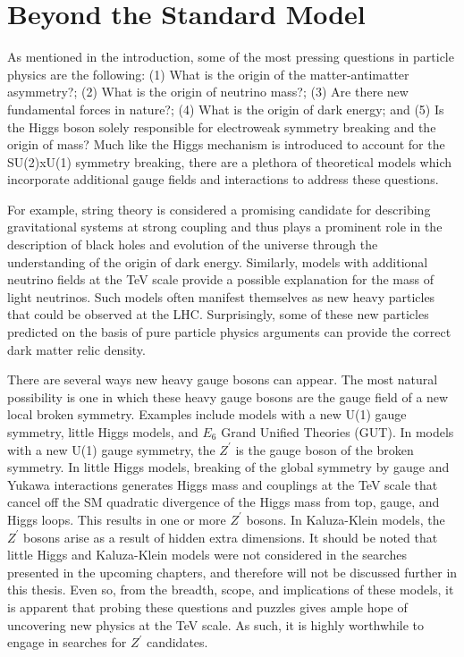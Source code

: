 \section{Beyond the Standard Model}


As mentioned in the introduction, some of the most pressing questions in particle physics are the following: (1) What is the origin of the matter-antimatter asymmetry?; (2) What is the origin of neutrino mass?; (3) Are there new fundamental forces in nature?; (4) What is the origin of dark energy; and (5) Is the Higgs boson solely responsible for electroweak symmetry breaking and the origin of mass? Much like the Higgs mechanism is introduced to account for the SU(2)xU(1) 
symmetry breaking, there are a plethora of theoretical models which incorporate additional gauge fields and interactions to address these questions. 

For example, string theory is considered a promising candidate for describing gravitational systems at strong coupling and thus plays a prominent role in the description of black holes and evolution of the universe through the understanding of the origin of dark energy. Similarly, models with additional neutrino fields at the TeV scale provide a possible explanation for the mass of light neutrinos. Such models often manifest themselves as new heavy particles that could be observed at the LHC. Surprisingly, some of these new particles predicted on the basis of pure particle physics arguments can provide the correct dark matter relic density. 

There are several ways new heavy gauge bosons can appear. The most natural possibility is one in which these heavy gauge bosons are the gauge field of a new local broken symmetry. Examples include models with a new U(1) gauge symmetry\cite{SSM}, little Higgs models\cite{LittleHiggs}, and $E_6$ Grand Unified Theories (GUT)\cite{E6}. In models with a new U(1) gauge symmetry, the $Z^\prime$ is the gauge boson of the broken symmetry. In little Higgs models, breaking of the global symmetry by gauge and Yukawa interactions generates Higgs mass and couplings at the TeV scale that cancel off the SM quadratic divergence of the Higgs mass from top, gauge, and Higgs loops. This results in one or more $Z^\prime$ bosons. In Kaluza-Klein models, the $Z^\prime$ bosons arise as a result of hidden extra dimensions.  It should be noted that little Higgs and Kaluza-Klein models were not considered in the searches presented in the upcoming chapters, and therefore will not be discussed further in this thesis. Even so, from the breadth, scope, and implications of these models, it is apparent that probing these questions and puzzles gives ample hope of uncovering new physics at the TeV scale. As such, it is highly worthwhile to engage in searches for $Z^\prime$ candidates.

